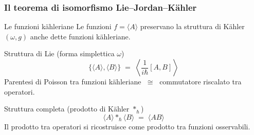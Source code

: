 \documentclass[aspectratio=169,11pt]{beamer}
\begin{document}
		\begin{frame}
		\frametitle{Il teorema di isomorfismo Lie--Jordan--K\"ahler}
		
		\begin{block}{Le funzioni k\"ahleriane}
			Le funzioni $f=\langle A\rangle$ preservano la struttura di K\"ahler $(\omega,g)$ anche dette \alert{funzioni k\"ahleriane}.
		\end{block}
		
		\begin{exampleblock}{Struttura di Lie (forma simplettica $\omega$)}
			\[
			\{\langle A\rangle,\langle B\rangle\} \;=\; \left\langle \frac{1}{i\hbar}[A,B] \right\rangle
			\]
			Parentesi di Poisson tra funzioni k\"ahleriane $\;\cong\;$ commutatore riscalato tra operatori.
		\end{exampleblock}
		
		\begin{exampleblock}{Struttura completa (prodotto di K\"ahler $*_\hbar$)}
			\[
			\langle A\rangle *_\hbar \langle B\rangle \;=\; \langle AB \rangle
			\]
			Il prodotto tra operatori si ricostruisce come prodotto tra funzioni osservabili.
		\end{exampleblock}
		
	\end{frame}
	
\end{document}
